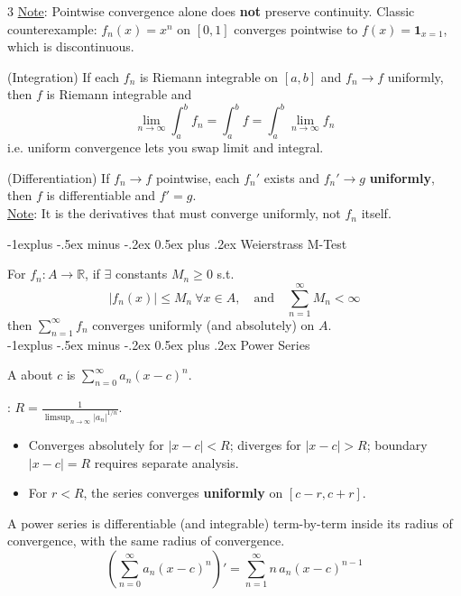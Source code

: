 \documentclass[10pt,landscape,letterpaper]{article}
\makeatletter
\renewcommand{\subsection}{\@startsection{subsection}{2}{0mm}%
                                {-1explus -.5ex minus -.2ex}%
                                {0.5ex plus .2ex}%
                                {\sffamily\normalsize\itshape}}
\makeatother
\begin{document}
\begin{multicols}{3}
\underline{Note}: Pointwise convergence alone does \textbf{not} preserve continuity. Classic counterexample: $f_n(x) = x^n$ on $[0,1]$ converges pointwise to $f(x) = \mathbf{1}_{x=1}$, which is discontinuous.

 (Integration) If each $f_n$ is Riemann integrable on $[a, b]$ and $f_n \to f$ uniformly, then $f$ is Riemann integrable and
\[
\lim_{n \to \infty} \int_a^b f_n = \int_a^b f = \int_a^b \lim_{n \to \infty} f_n
\]
i.e. uniform convergence lets you swap limit and integral.

 (Differentiation) If $f_n \to f$ pointwise, each $f_n'$ exists and $f_n' \to g$ \textbf{uniformly}, then $f$ is differentiable and $f' = g$.
\\
\underline{Note}: It is the derivatives that must converge uniformly, not $f_n$ itself.

\subsection{Weierstrass M-Test}

 For $f_n: A \to \mathbb{R}$, if $\exists$ constants $M_n \geq 0$ s.t.
\[
|f_n(x)| \leq M_n\ \forall x \in A, \quad \text{and} \quad \sum_{n=1}^\infty M_n < \infty
\]
then $\sum_{n=1}^\infty f_n$ converges uniformly (and absolutely) on $A$.
\\

\subsection{Power Series}

A  about $c$ is $\sum_{n=0}^\infty a_n(x - c)^n$.

: $R = \frac{1}{\limsup_{n \to \infty} |a_n|^{1/n}}$.
\begin{itemize}
    \item Converges absolutely for $|x - c| < R$; diverges for $|x - c| > R$; boundary $|x-c|=R$ requires separate analysis.
    \item For $r < R$, the series converges \textbf{uniformly} on $[c-r, c+r]$.
\end{itemize}

 A power series is differentiable (and integrable) term-by-term inside its radius of convergence, with the same radius of convergence.
\[
\left(\sum_{n=0}^\infty a_n(x-c)^n\right)' = \sum_{n=1}^\infty n\, a_n(x-c)^{n-1}
\]


\end{multicols}
\end{document}
